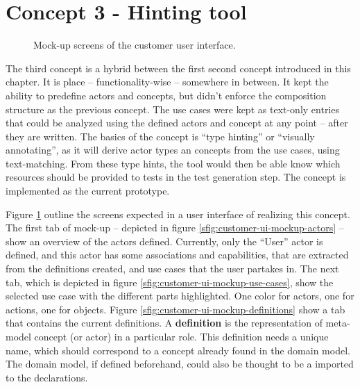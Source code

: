 \section{Concept 3 - Hinting tool}
\label{sec:3rd-iteration}
\begin{figure}[!htbp]
  \centering
    
  \caption{Mock-up screens of the customer user interface.}
  \label{fig:concept3-mockup-screens}
\end{figure}
\noindent The third concept is a hybrid between the first second concept introduced in this chapter. It is place -- functionality-wise -- somewhere in between. It kept the ability to predefine actors and concepts, but didn't enforce the composition structure as the previous concept. The use cases were kept as text-only entries that could be analyzed using the defined actors and concept at any point -- after they are written. The basics of the concept is ``type hinting'' or ``visually annotating'', as it will derive actor types an concepts from the use cases, using text-matching. From these type hints, the tool would then be able know which resources should be provided to tests in the test generation step. The concept is implemented as the current prototype.\medskip

\noindent Figure \ref{fig:concept3-mockup-screens} outline the screens expected in a user interface of realizing this concept. The first tab of mock-up -- depicted in figure \ref{sfig:customer-ui-mockup-actors} -- show an overview of the actors defined. Currently, only the ``User'' actor is defined, and this actor has some associations and capabilities, that are extracted from the definitions created, and use cases that the user partakes in. The next tab, which is depicted in figure \ref{sfig:customer-ui-mockup-use-cases}, show the selected use case with the different parts highlighted. One color for actors, one for actions, one for objects. Figure \ref{sfig:customer-ui-mockup-definitions} show a tab that contains the current definitions. A \textbf{definition} is the representation of meta-model concept (or actor) in a particular role. This definition needs a unique name, which should correspond to a concept already found in the domain model. The domain model, if defined beforehand, could also be thought to be a imported to the declarations.


